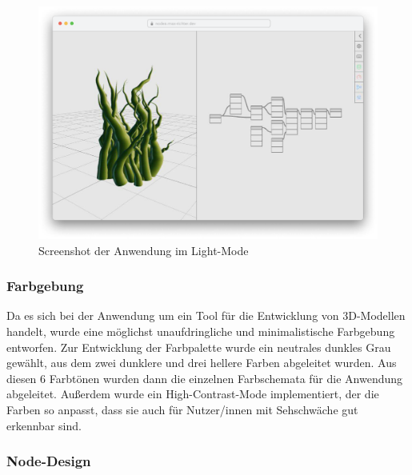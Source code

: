 \documentclass[ngerman]{article}
\begin{document}
\begin{figure}[hbtp]
  \centering
  \includegraphics[width=1\textwidth]{graphics/layout_light.pdf}
  \caption{Screenshot der Anwendung im Light-Mode}
  \label{fig:screenshot_nodarium}
\end{figure}

\subsubsection{Farbgebung}

Da es sich bei der Anwendung um ein Tool für die Entwicklung von 3D-Modellen handelt, wurde eine  möglichst unaufdringliche und minimalistische Farbgebung entworfen.
Zur Entwicklung der Farbpalette wurde ein neutrales dunkles Grau gewählt, aus dem zwei dunklere und drei hellere Farben abgeleitet wurden. Aus diesen 6 Farbtönen wurden dann die einzelnen Farbschemata für die Anwendung abgeleitet. Außerdem wurde ein High-Contrast-Mode implementiert, der die Farben so anpasst, dass sie auch für Nutzer/innen mit Sehschwäche gut erkennbar sind.

\subsubsection{Node-Design}
\end{document}
